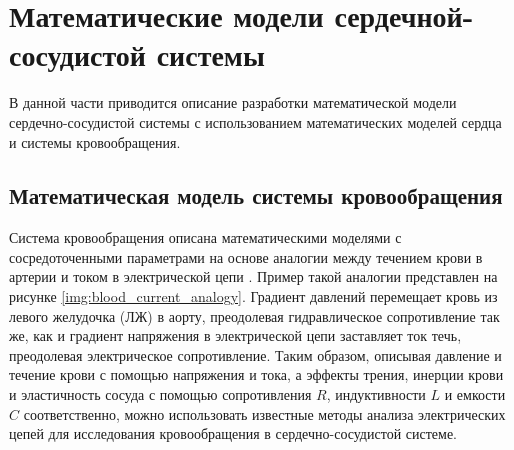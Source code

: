 % 
% 

\section{Математические модели сердечной-сосудистой системы} \label{cvs_model_implementation}

В данной части приводится описание разработки математической модели сердечно-сосудистой системы с использованием математических моделей сердца и системы кровообращения.

\subsection*{Математическая модель системы кровообращения}

Система кровообращения описана математическими моделями с сосредоточенными параметрами на основе аналогии между течением крови в артерии и током в электрической цепи \cite{Kokalari_2013, shi2011review}. Пример такой аналогии представлен на рисунке \ref{img:blood_current_analogy}. Градиент давлений перемещает кровь из левого желудочка (ЛЖ) в аорту, преодолевая гидравлическое сопротивление так же, как и градиент напряжения в электрической цепи заставляет ток течь, преодолевая электрическое сопротивление. Таким образом, описывая давление и течение крови с помощью напряжения и тока, а эффекты трения, инерции крови и эластичность сосуда с помощью сопротивления $R$, индуктивности $L$ и емкости $C$ соответственно, можно использовать известные методы анализа электрических цепей для исследования кровообращения в сердечно-сосудистой системе. 

